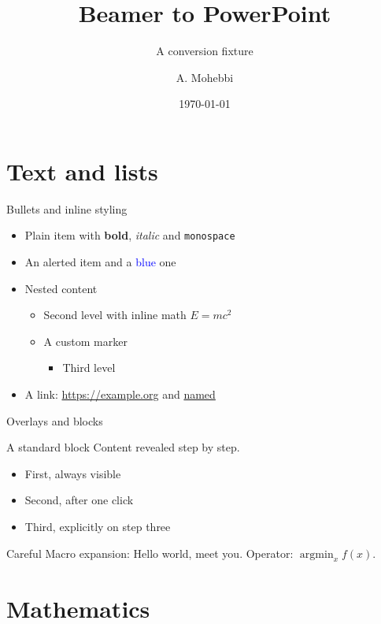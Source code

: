 \documentclass[aspectratio=43]{beamer}
\title{Beamer to PowerPoint}
\subtitle{A conversion fixture}
\author{A. Mohebbi}
\institute{Polytechnique Montr\'eal}
\date{\today}
\newcommand{\greet}[2][world]{Hello #1, meet #2}
\DeclareMathOperator{\argmin}{argmin}
\begin{document}
\begin{frame}
  \titlepage
\end{frame}

\section{Text and lists}

\begin{frame}{Bullets and inline styling}
  \begin{itemize}
    \item Plain item with \textbf{bold}, \emph{italic} and \texttt{monospace}
    \item An \alert{alerted} item and a \textcolor{blue}{blue} one
    \item Nested content
      \begin{itemize}
        \item Second level with inline math $E = mc^2$
        \item[$\star$] A custom marker
          \begin{itemize}
            \item Third level
          \end{itemize}
      \end{itemize}
    \item A link: \url{https://example.org} and \href{https://example.org}{named}
  \end{itemize}
\end{frame}

\begin{frame}{Overlays and blocks}
  \begin{block}{A standard block}
    Content revealed step by step.
  \end{block}
  \begin{itemize}
    \item First, always visible
    \pause
    \item Second, after one click
    \item<3-> Third, explicitly on step three
  \end{itemize}
  \begin{alertblock}{Careful}
    Macro expansion: \greet{you}. Operator: $\argmin_x f(x)$.
  \end{alertblock}
\end{frame}

\section{Mathematics}
\end{document}
